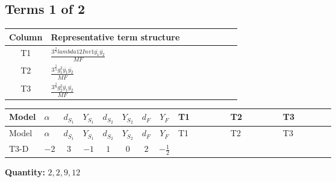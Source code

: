 \documentclass[8pt]{article}
\begin{document}
\begin{landscape}
\subsection*{Terms 1 of 2}
\begin{center}
\begin{tabular}{@{}c >{\raggedright\arraybackslash}p{0.82\linewidth}@{}}
\toprule
Column & Representative term structure \\
\midrule
T1 & \(\displaystyle \frac{3^{\frac{3}{4}} lambda12Inv1 \overline{y_{1}} \overline{y_{2}}}{MF}\) \\
\midrule
T2 & \(\displaystyle \frac{3^{\frac{3}{4}} g_{1}^{2} \overline{y_{1}} \overline{y_{2}}}{MF}\) \\
\midrule
T3 & \(\displaystyle \frac{3^{\frac{3}{4}} g_{2}^{2} \overline{y_{1}} \overline{y_{2}}}{MF}\) \\
\midrule
\bottomrule
\end{tabular}
\end{center}
\smallskip
\tiny
\begin{longtable}{@{}llcccccc >{\raggedright\arraybackslash}p{0.21\linewidth} >{\raggedright\arraybackslash}p{0.21\linewidth} >{\raggedright\arraybackslash}p{0.21\linewidth}@{}}
\toprule
Model & $\alpha$ & $d_{S_1}$ & $Y_{S_1}$ & $d_{S_2}$ & $Y_{S_2}$ & $d_F$ & $Y_F$ & T1 & T2 & T3 \\
\midrule
\endfirsthead
\toprule
Model & $\alpha$ & $d_{S_1}$ & $Y_{S_1}$ & $d_{S_2}$ & $Y_{S_2}$ & $d_F$ & $Y_F$ & T1 & T2 & T3 \\
\midrule
\endhead
T3-D & $-2$ & $3$ & $-1$ & $1$ & $0$ & $2$ & $-\frac{1}{2}$ & \scriptsize\adjustbox{max width=\linewidth}{$\begin{gathered} \frac{3^{\frac{3}{4}} lambda12Inv1 \overline{y_{1}} \overline{y_{2}}}{6 MF}\end{gathered}$} & \scriptsize\adjustbox{max width=\linewidth}{$\begin{gathered} \frac{3^{\frac{3}{4}} g_{1}^{2} \overline{y_{1}} \overline{y_{2}}}{8 MF}\end{gathered}$} & \scriptsize\adjustbox{max width=\linewidth}{$\begin{gathered} \frac{17 \cdot 3^{\frac{3}{4}} g_{2}^{2} \overline{y_{1}} \overline{y_{2}}}{24 MF}\end{gathered}$} \\
\midrule
\bottomrule
\end{longtable}
\clearpage
\noindent\textbf{Quantity: }$\mathrm{2,2,9,12}$\par\smallskip

\end{landscape}
\end{document}
